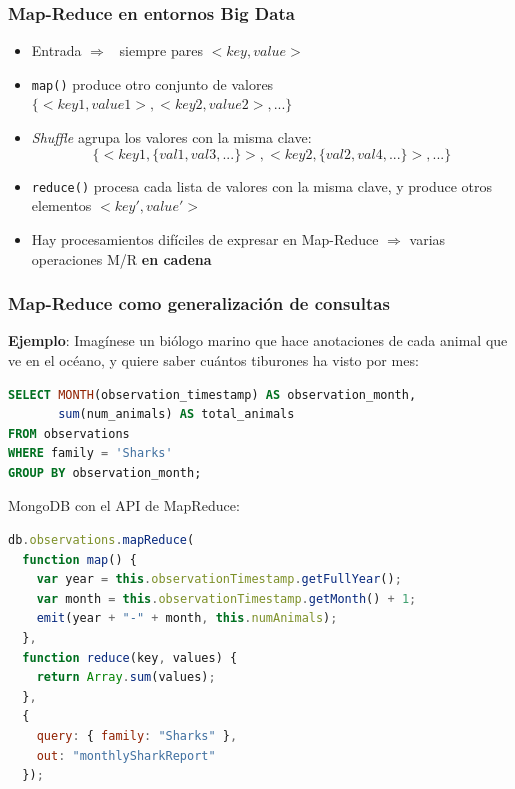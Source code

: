 \documentclass[14pt]{beamer}
\newcommand{\ra}{{\color{blue} $\Rightarrow${}~{}}}
\begin{document}
\begin{frame}
\frametitle{Map-Reduce en entornos Big Data}
\begin{itemize}
  \item Entrada \ra{} siempre pares $<key,value>$

  \item {\tt map()} produce otro conjunto de valores
    $\{<key1,value1>,<key2,value2>,...\}$

\item {\em Shuffle} agrupa los valores con la misma clave:
\begin{displaymath}
\{<key1,\{val1,val3,...\}>,<key2,\{val2,val4,...\}>,...\}
\end{displaymath}

\item {\tt reduce()} procesa cada lista de valores con la misma clave, y
  produce otros elementos $<key',value'>$

\item Hay procesamientos difíciles de expresar en Map-Reduce $\Rightarrow$
  varias operaciones M/R {\bf en cadena}
  \end{itemize}

\end{frame}


\begin{frame}
  \frametitle{Map-Reduce como generalización de consultas}

  {\bf Ejemplo}: Imagínese un biólogo marino que hace anotaciones de cada
  animal que ve en el océano, y quiere saber cuántos tiburones ha visto por
  mes:

  \begin{lstlisting}[language=SQL]
SELECT MONTH(observation_timestamp) AS observation_month,
       sum(num_animals) AS total_animals
FROM observations
WHERE family = 'Sharks'
GROUP BY observation_month;
\end{lstlisting}

  \framebreak

MongoDB con el API de MapReduce:
\begin{lstlisting}[language=Javascript,basicstyle=\footnotesize\tt]
db.observations.mapReduce(
  function map() {
    var year = this.observationTimestamp.getFullYear();
    var month = this.observationTimestamp.getMonth() + 1;
    emit(year + "-" + month, this.numAnimals);
  },
  function reduce(key, values) {
    return Array.sum(values);
  },
  {
    query: { family: "Sharks" },
    out: "monthlySharkReport"
  });
\end{lstlisting}



\end{frame}
\end{document}
